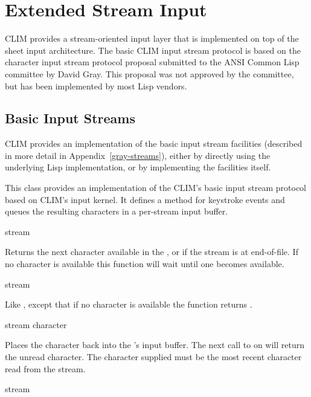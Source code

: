 
\chapter {Extended Stream Input}
\label {extended-input}

CLIM provides a stream-oriented input layer that is implemented on top of the
sheet input architecture.  The basic CLIM input stream protocol is based on the
character input stream protocol proposal submitted to the ANSI Common Lisp
committee by David Gray.  This proposal was not approved by the committee, but
has been implemented by most Lisp vendors.

\section {Basic Input Streams}

CLIM provides an implementation of the basic input stream facilities (described
in more detail in Appendix~\ref{gray-streams}), either by directly using the
underlying Lisp implementation, or by implementing the facilities itself.


This class provides an implementation of the CLIM's basic input stream protocol
based on CLIM's input kernel.  It defines a  method for
keystroke events and queues the resulting characters in a per-stream input
buffer.
\Mutable

 {stream}

Returns the next character available in the  , or
 if the stream is at end-of-file.  If no character is available this
function will wait until one becomes available.

 {stream}

Like , except that if no character is available the
function returns .

 {stream character}

Places the character  back into the 
's input buffer.  The next call to  on 
will return the unread character.  The character supplied must be the most
recent character read from the stream.

 {stream}

